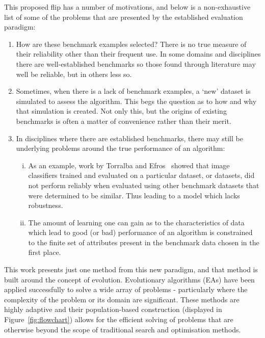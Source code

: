 \documentclass[smallextended]{svjour3}
\begin{document}
This proposed flip has a number of motivations, and below is a non-exhaustive
list of some of the problems that are presented by the established evaluation
paradigm:
\begin{enumerate}
    \item How are these benchmark examples selected? There is no true measure of
        their reliability other than their frequent use. In some domains and
        disciplines there are well-established benchmarks so those found through
        literature may well be reliable, but in others less so.
    \item Sometimes, when there is a lack of benchmark examples, a `new' dataset
        is simulated to assess the algorithm. This begs the question as to how
        and why that simulation is created. Not only this, but the origins of
        existing benchmarks is often a matter of convenience rather than their
        merit.
    \item In disciplines where there are established benchmarks, there may still
        be underlying problems around the true performance of an algorithm:
        \begin{enumerate}[(i)]
            \item As an example, work by Torralba and Efros~\cite{Torralba2011}
                showed that image classifiers trained and evaluated on a
                particular dataset, or datasets, did not perform reliably when
                evaluated using other benchmark datasets that were determined
                to be similar. Thus leading to a model which lacks robustness.
            \item The amount of learning one can gain as to the characteristics
                of data which lead to good (or bad) performance of an algorithm
                is constrained to the finite set of attributes present in the
                benchmark data chosen in the first place.
        \end{enumerate}
\end{enumerate}

This work presents just one method from this new paradigm, and that method is
built around the concept of evolution. Evolutionary algorithms (EAs) have been
applied successfully to solve a wide array of problems \-- particularly where
the complexity of the problem or its domain are significant. These methods are
highly adaptive and their population-based construction (displayed in
Figure~\ref{fig:flowchart}) allows for the efficient solving of problems that
are otherwise beyond the scope of traditional search and optimisation methods.
\end{document}
